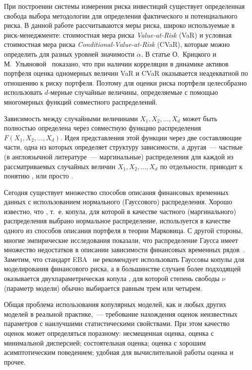 
При построении системы измерения риска инвестиций существует определенная свобода выбора методологии для определения фактического и потенциального риска.
В данной работе рассчитываются  меры риска, широко используемые в риск-менеджменте:  стоимостная мера риска \textit{Value-at-Risk} (VaR) и условная  стоимостная мера риска \textit{Conditional-Value-at-Risk} (CVaR), которые можно определить для разных уровней значимости $\alpha$.
В статье О.~Крицкого и М.~Ульяновой~\cite{Kritski2007} показано, что при наличии корреляции в динамике активов портфеля оценка одномерных величин VaR и CVaR оказывается неадекватной по отношению к риску портфеля. 
Поэтому для оценки риска портфеля целесобразно использовать $d$-мерные случайные величины, определяемые с помощью многомерных функций совместного распределений.

Зависимость между случайными величинами $X_1, X_2, \ldots, X_d$ может быть полностью определена через совместную функцию распределения $F(X_1, X_2, \ldots, X_d)$.
Идея представления этой функции через две составляющие части, одна из которых определяет структуру зависимости, а другая~---  частные (в англоязычной литературе~--- маргинальные) распределения для каждой из рассматриваемых случайных величин $X_1, X_2, \ldots, X_d$ по отдельности, приводит к понятию , или просто .

Сегодня существует множество способов описания финансовых временных данных с использованием нормального (Гауссового) распределения.
Хорошо известно, что , т.~е. копула, для которой в качестве частного (маргинального) распределения выбрано нормальное распределение, используется в качестве одного из способов описания портфеля в теории Марковица. 
С другой стороны, многие эмпирические исследования показали, что распределение Гаусса имеет множество недостатков в описании зависимости финансовых временных рядов~\cite{Limp2011, Rachev2005, Wilmott2007}. 
Заметим, что стандарт EBA~\cite{EBA2015} не рекомендует использовать Гауссовы копулы для моделирования финансового риска, а в большинстве случаев более подходящей оказывается двухпараметрическая копула , для которой степень свободы $\nu$ (параметр модели) обычно выбирается равным трем или четырем.

Общая проблема использования копулярных моделей, как и любых других моделей в реальной практике,~--- требование нахождения оценок неизвестных параметров с наилучшими статистическими свойствами. 
При этом качество оценок может определяться по\-разному: несмещенная оценка, оценка с минимальной дисперсией; состоятельная оценка; оценка с хорошим асимптотическим поведением; удобная для вычислительной работы оценка и прочее.

